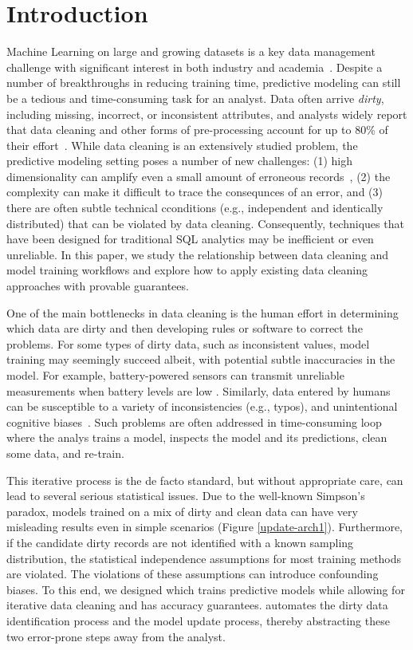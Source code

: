 \section{Introduction}
Machine Learning on large and growing datasets is a key data management challenge with significant interest in both industry and academia~\cite{bdas, alexandrov2014stratosphere, crotty2014tupleware, tensor}.
Despite a number of breakthroughs in reducing training time, predictive modeling can still be a tedious and time-consuming task for an analyst. 
Data often arrive \emph{dirty}, including missing, incorrect, or inconsistent attributes, and analysts widely report that data cleaning and other forms of pre-processing account for up to 80\% of their effort~\cite{nytimes, kandel2012}.
While data cleaning is an extensively studied problem, the predictive modeling setting poses a number of new challenges: (1) high dimensionality can amplify even a small amount of erroneous records~\cite{xiaofeature}, (2) the complexity can make it difficult to trace the consequnces of an error, and (3) there are often subtle technical cconditions (e.g., independent and identically distributed) that can be violated by data cleaning.
Consequently, techniques that have been designed for traditional SQL analytics may be inefficient or even unreliable.
In this paper, we study the relationship between data cleaning and model training workflows and explore how to apply existing data cleaning approaches with provable guarantees.

One of the main bottlenecks in data cleaning is the human effort in determining which data are dirty and then developing rules or software to correct the problems.
For some types of dirty data, such as inconsistent values, model training may seemingly succeed albeit, with potential subtle inaccuracies in the model.
For example, battery-powered sensors can transmit unreliable measurements when battery levels are low \cite{DBLP:conf/pervasive/JefferyAFHW06}. 
Similarly, data entered by humans can be susceptible to a variety of inconsistencies (e.g., typos), and unintentional cognitive biases~\cite{DBLP:conf/recsys/KrishnanPFG14}.
Such problems are often addressed in time-consuming loop where the analys trains a model, inspects the model and its predictions, clean some data, and re-train.

This iterative process is the de facto standard, but without appropriate care, can lead to several serious statistical issues.
Due to the well-known Simpson's paradox, models trained on a mix of dirty and clean data can have very misleading results even in simple scenarios (Figure \ref{update-arch1}).
Furthermore, if the candidate dirty records are not identified with a known sampling distribution, the statistical independence assumptions for most training methods are violated. 
The violations of these assumptions can introduce confounding biases.
To this end, we designed \sys which trains predictive models while allowing for iterative data cleaning and has accuracy guarantees.
\sys automates the dirty data identification process and the model update process, thereby abstracting these two error-prone steps away from the analyst.


